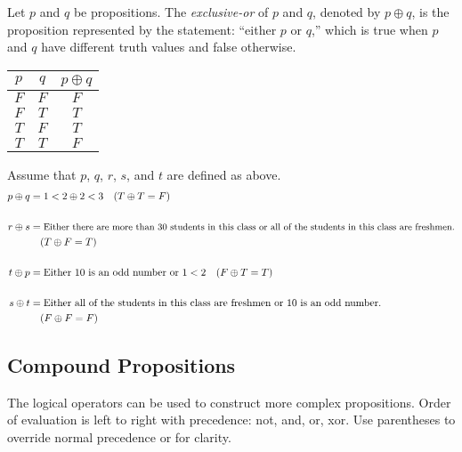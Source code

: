 \documentclass[letterpaper,12pt,fleqn]{article}
\newcommand{\lxor}{\oplus}
\begin{document}
\begin{definition}[Exclusive-OR]
  Let \(p\) and \(q\) be propositions.  The \emph{exclusive-or} of \(p\) and \(q\), denoted by \(p\lxor q\), is the
  proposition represented by the statement: ``either \(p\) or \(q\),'' which is true when \(p\) and \(q\) have
  different truth values and false otherwise.

  \begin{center}
    \begin{tabular}{|cc|c|}
      \hline
      \(p\) & \(q\) & \(p\lxor q\) \\
      \hline
      \(F\) & \(F\) & \(F\) \\
      \hline
      \(F\) & \(T\) & \(T\) \\
      \hline
      \(T\) & \(F\) & \(T\) \\
      \hline
      \(T\) & \(T\) & \(F\) \\
      \hline
    \end{tabular}
  \end{center}
\end{definition}

\begin{examples}
  Assume that \(p\), \(q\), \(r\), \(s\), and \(t\) are defined as above.
  \begin{align*}
    p\lxor q &= 1<2\lxor 2<3\quad(T\lxor T=F) \\
    \\
    r\lxor s &= \text{\small Either there are more than 30 students in this class or all of the students
      in this class are freshmen.} \\
    & \quad(T\lxor F=T) \\
    \\
    t\lxor p &= \text{Either}\ 10\ \text{is an odd number or}\ 1<2\quad(F\lxor T=T) \\
    \\
    s\lxor t &= \text{Either all of the students in this class are freshmen or}\ 10\ \text{is an odd number.} \\
    & \quad(F\lxor F=F)
  \end{align*}
\end{examples}

\subsection*{Compound Propositions}

The logical operators can be used to construct more complex propositions.  Order of evaluation is left to right
with precedence: not, and, or, xor.  Use parentheses to override normal precedence or for clarity.
\end{document}
